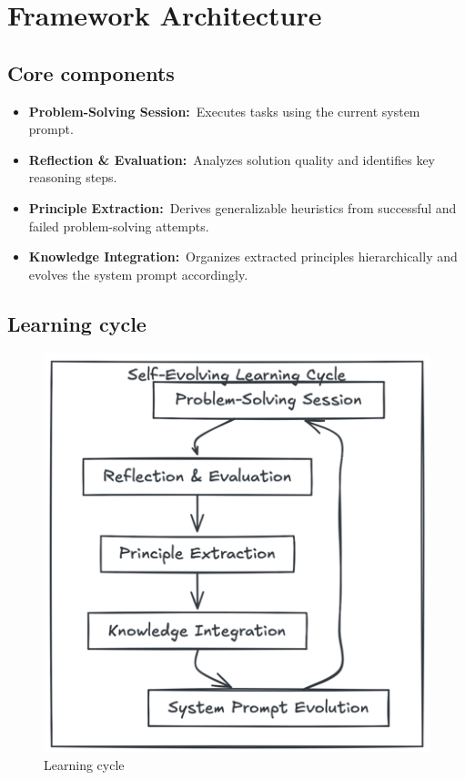 \documentclass[10pt,a4paper,twocolumn]{article}
\begin{document}
\section{{Framework Architecture} }



\subsection{Core components}


\begin{itemize}
    \item \textbf{Problem-Solving Session:} Executes tasks using the current system prompt.
    \item \textbf{Reflection \& Evaluation:} Analyzes solution quality and identifies key reasoning steps.
    \item \textbf{Principle Extraction:} Derives generalizable heuristics from successful and failed problem-solving attempts.
    \item \textbf{Knowledge Integration:} Organizes extracted principles hierarchically and evolves the system prompt accordingly.
\end{itemize}



\subsection{Learning cycle}

\begin{figure}
    \centering
    \includegraphics[width=0.75\linewidth]{learning_cycle.png}
    \caption{Learning cycle}
    \label{fig:cycle}
\end{figure}
\end{document}
